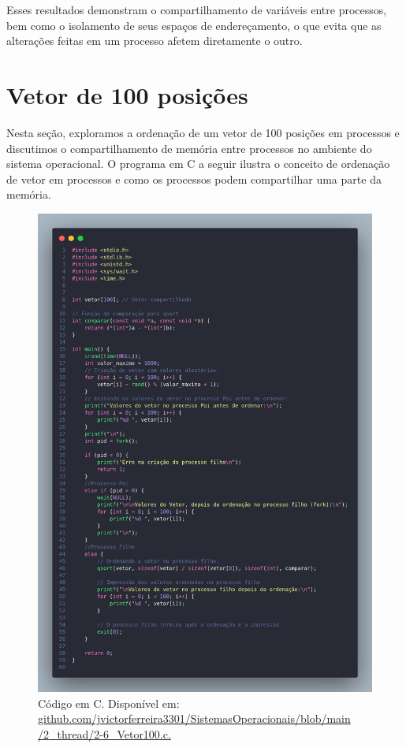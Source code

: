 \documentclass[
	12pt,				%
	openright,			%
	oneside,			%
	a4paper,			%
	chapter=TITLE,		%
	english,			%
	french,				%
	spanish,			%
	brazil				%
	]{abntex2}
\theoremstyle{definition}
\begin{document}
Esses resultados demonstram o compartilhamento de variáveis entre processos, bem como o isolamento de seus espaços de endereçamento, o que evita que as alterações feitas em um processo afetem diretamente o outro.

\section{Vetor de 100 posições}

Nesta seção, exploramos a ordenação de um vetor de 100 posições em processos e discutimos o compartilhamento de memória entre processos no ambiente do sistema operacional. O programa em C a seguir ilustra o conceito de ordenação de vetor em processos e como os processos podem compartilhar uma parte da memória.

\begin{figure}
    \centering
    \includegraphics[width=0.8 \textwidth]{imagens/processos_6.png}
    \caption{Código em C. Disponível em: \href{https://github.com/jvictorferreira3301/Sistemas_Operacionais/blob/main/2_thread/2-6_Vetor100.c}{github.com/jvictorferreira3301/SistemasOperacionais/blob/main
    /2\_thread/2-6\_Vetor100.c.}}
    \label{fig:proc6}
\end{figure}
\end{document}
